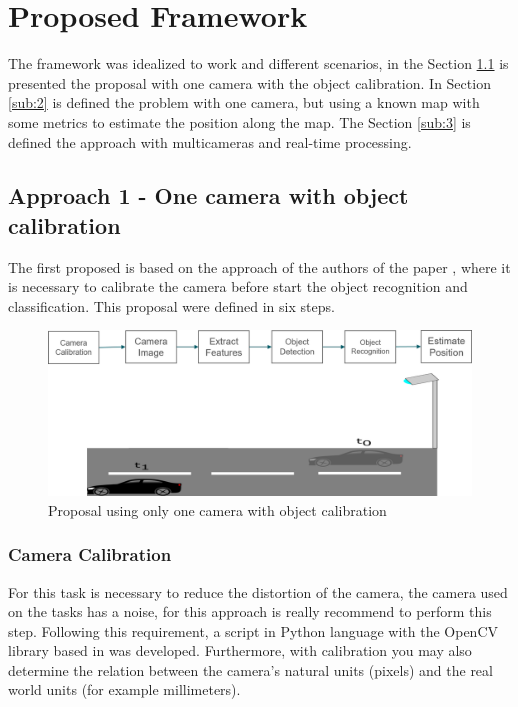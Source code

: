 
\chapter{Proposed Framework}
\label{capitulo4}
The framework was idealized to work and different scenarios, in the Section \ref{sub:1} is presented the proposal with one camera with the object calibration. In Section \ref{sub:2} is defined the problem with one camera, but using a known map with some metrics to estimate the position along the map. The Section \ref{sub:3} is defined the approach with multicameras and real-time processing. 



\section{Approach 1 - One camera with object calibration}\label{sub:1}

The first proposed is based on the approach of the authors of the paper \cite{8678911}, where it is necessary to calibrate the camera before start the object recognition and classification. This proposal were defined in six steps.

\begin{figure}[H]
\centering
\includegraphics[width=\textwidth]{imagens/proposal1.png}
\caption{Proposal using only one camera with object calibration}
\label{fig:proposal1}
\end{figure}

\subsection{Camera Calibration}

For this task is necessary to reduce the distortion of the camera, the camera used on the tasks has a noise, for this approach is really recommend to perform this step. Following this requirement, a script in Python language with the OpenCV library based in \cite{zhu2020camera} was developed. Furthermore, with calibration you may also determine the relation between the camera’s natural units (pixels) and the real world units (for example millimeters).

